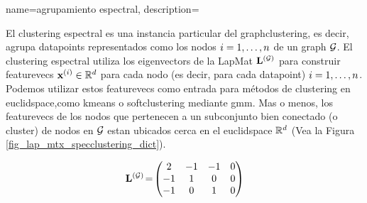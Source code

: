 {name={agrupamiento espectral},
	description={El \gls{clustering} espectral  es una instancia particular del 
		\gls{graphclustering}, es decir, agrupa \gls{datapoint}s 
		representados como los nodos $i=1,\ldots,n$ de un \gls{graph} $\mathcal{G}$. 
		El \gls{clustering} espectral utiliza los \gls{eigenvector}s de la \gls{LapMat} ${\bf L}^{(\mathcal{G})}$ 
		para construir \gls{featurevec}s ${\bf x}^{(i)} \in \mathbb{R}^{d}$ 
		para cada nodo (es decir, para cada \gls{datapoint}) $i=1,\ldots,n$. Podemos utilizar estos \gls{featurevec}s 
		como entrada para métodos de \gls{clustering} en \gls{euclidspace},como \gls{kmeans} 
		o \gls{softclustering} mediante \gls{gmm}. Mas o menos, los \gls{featurevec}s de los nodos 
		que pertenecen a un subconjunto bien conectado (o \gls{cluster}) de nodos en $\mathcal{G}$ estan ubicados 
		cerca en el \gls{euclidspace} $\mathbb{R}^{d}$ (Vea la Figura \ref{fig_lap_mtx_specclustering_dict}). 
		\begin{figure}[H]
			\begin{center}
				\begin{minipage}{0.4\textwidth}
				\end{minipage} 
				\hspace*{5mm}
				\begin{minipage}{0.4\textwidth}
					\begin{equation} 
						{\bf L}^{(\mathcal{G})}\!=\!
						\begin{pmatrix} 
							2 & -1 & -1 & 0 \\ 
							-1 & 1 & 0 & 0 \\  
							-1 & 0 & 1 & 0 \\ 

\end{pmatrix}
\end{equation}
\end{minipage}
\end{center}
\end{figure}}}

